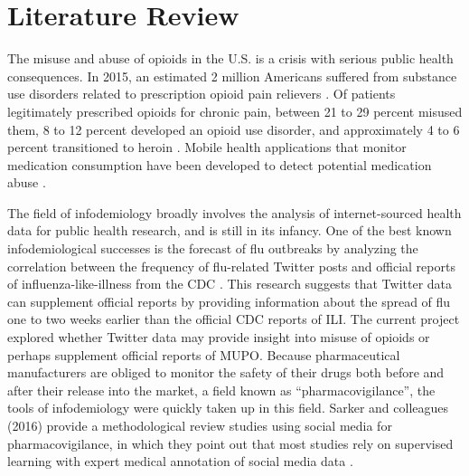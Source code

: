 \documentclass[sigconf]{acmart}
\begin{document}
\section{Literature Review} 

The misuse and abuse of opioids in the U.S. is a crisis with serious public 
health consequences. In 2015, an estimated 2 million Americans suffered from 
substance use disorders related to prescription opioid pain relievers 
\cite{nida18, cdc18}. Of patients legitimately prescribed opioids for chronic 
pain, between 21 to 29 percent misused them, 8 to 12 percent developed an 
opioid use disorder, and approximately 4 to 6 percent transitioned to heroin 
\cite{vowles15, carlson16}. Mobile health applications that monitor medication 
consumption have been developed to detect potential medication abuse 
\cite{varshney13}.

The field of infodemiology broadly involves the analysis of internet-sourced 
health data for public health research, and is still in its infancy. One of 
the best known infodemiological successes is the forecast of flu outbreaks 
by analyzing the correlation between the frequency of flu-related Twitter 
posts and official reports of influenza-like-illness from the CDC 
\cite{culotta10, paul14}. This research suggests that Twitter data can 
supplement official reports by providing information about the spread of 
flu one to two weeks earlier than the official CDC reports of ILI. The 
current project explored whether Twitter data may provide insight into 
misuse of opioids or perhaps supplement official reports of MUPO. Because 
pharmaceutical manufacturers are obliged to monitor the safety of their 
drugs both before and after their release into the market, a field known as
``pharmacovigilance'', the tools of infodemiology were quickly taken up 
in this field. Sarker and colleagues (2016) provide a methodological review
studies using social media for pharmacovigilance, in which they point out 
that most studies rely on supervised learning with expert medical annotation 
of social media data \cite{sarker16}. 
\end{document}
